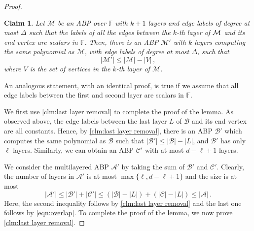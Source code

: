 \documentclass[10pt,a4paper]{article}
\newtheorem{claim}[theorem]{Claim}
\newcommand{\F}{\mathbb F}
\newcommand{\abs}[1]{\left|#1\right|}
\newcommand{\inparen}[1]{\left(#1\right)}
\begin{document}
\begin{proof}
	\begin{claim}\label{clm:last layer removal}
		Let ${\mathcal{M}}$ be an ABP over $\F$ with $k+1$ layers and edge labels of degree at most $\Delta$ such that the labels of all the edges between the $k$-th layer of ${\cal M}$ and its end vertex are scalars in $\F$. Then, there is an ABP $\mathcal{M}'$ with  $k$ layers computing the same polynomial as $\mathcal{M}$, with edge labels of degree at most $\Delta$, such that
		\[\abs{\mathcal{M}'} \leq \abs{\mathcal{M}} - \abs{V} \, , \]
		where $V$ is the set of vertices in the $k$-th layer of $\mathcal{M}$.
	\end{claim}
	
	An analogous statement, with an identical proof, is true if we assume that all edge labels between the first and second layer are scalars in $\F$.

	We first use \autoref{clm:last layer removal} to complete the proof of the lemma. As observed above, the edge labels between the last layer $L$ of $\mathcal{B}$ and its end vertex are all constants. Hence, by \autoref{clm:last layer removal}, there is an ABP $\mathcal{B}'$ which computes the same polynomial as $\mathcal{B}$ such that $\abs{\mathcal{B}'} \leq \abs{\mathcal{B}} - \abs{L}$, and $\mathcal{B}'$ has only $\ell$ layers. Similarly, we can obtain an ABP $\mathcal{C}'$ with at most $d-\ell+1$ layers.
	
	We consider the multilayered ABP $\mathcal{A}'$ by taking the sum of $\mathcal{B}'$ and $\mathcal{C}'$. Clearly, the number of layers in $\mathcal{A}'$ is at most $\max\{\ell, d-\ell+1\}$ and the size is at most 
	\[\abs{\mathcal{A}'} \leq  \abs{\mathcal{B}'} + \abs{\mathcal{C'}} \leq  \inparen{\abs{\mathcal{B}} - \abs{L}} + \inparen{\abs{\mathcal{C} }- \abs{L}} \leq \abs{\mathcal{A}} \, .\]
	Here, the second inequality follows by \autoref{clm:last layer removal} and the last one follows by \autoref{eqn:overlap}. To complete the proof of the lemma, we now prove \autoref{clm:last layer removal}. 
\end{proof}
	
\end{document}

